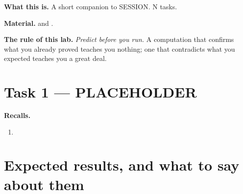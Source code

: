 \documentclass[11pt,a4paper]{article}
\begin{document}

\vspace{6pt}

\begin{plainbox}
\textbf{What this is.} A short companion to SESSION. N tasks.

\smallskip
\textbf{Material.}  and .
\end{plainbox}

\vspace{4pt}

\begin{warnbox}
\textbf{The rule of this lab.} \emph{Predict before you run.} A computation that
confirms what you already proved teaches you nothing; one that contradicts what you
expected teaches you a great deal.
\end{warnbox}

\section{Task 1 --- PLACEHOLDER}

\begin{plainbox}
\textbf{Recalls.}
\end{plainbox}

\begin{task}\label{task:a}
\leavevmode
\begin{enumerate}[label=\textbf{\arabic*.}]
\item
\end{enumerate}
\end{task}


\ifsolutions
\newpage
\section{Expected results, and what to say about them}

\fi
\end{document}
